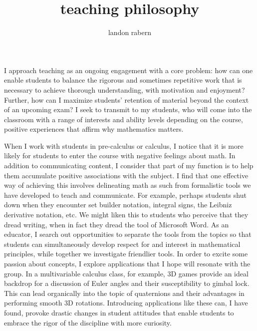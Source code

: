 \documentclass[12pt]{article}
\title{teaching philosophy}
\author{landon rabern}
\begin{document}
\maketitle
I approach teaching as an ongoing engagement with a core problem: how can one enable students to balance the rigorous and 
sometimes repetitive work that is necessary to achieve thorough understanding, with motivation and enjoyment? 
Further, how can I maximize students' retention of material beyond the context of an upcoming exam? 
I seek to transmit to my students, who will come into the classroom with a range of interests and ability levels
depending on the course, positive experiences that affirm why mathematics matters.

When I work with students in pre-calculus or calculus, I notice that it is more likely for students to enter the course with negative feelings about math. 
In addition to communicating content, I consider that part of my function is to help them accumulate positive associations with the subject. 
I find that one effective way of achieving this involves delineating math as such from formalistic tools we have developed to teach and communicate. 
For example, perhaps students shut down when they encounter set builder notation, integral signs, the Leibniz derivative notation, etc. 
We might liken this to students who perceive that they dread writing, when in fact they dread the tool of Microsoft Word. As an educator, 
I search out opportunities to separate the tools from the topics so that students can simultaneously develop respect for and interest in mathematical principles, 
while together we investigate friendlier tools. In order to excite some passion about concepts, I explore applications that I hope will resonate with the group. 
In a multivariable calculus class, for example, 3D games provide an ideal backdrop for a discussion of Euler angles and their susceptibility to gimbal lock. 
This can lead organically into the topic of quaternions and their advantages in performing smooth 3D rotations. Introducing applications like these can, 
I have found, provoke drastic changes in student attitudes that enable students to embrace the rigor of the discipline with more curiosity. 
\end{document}
